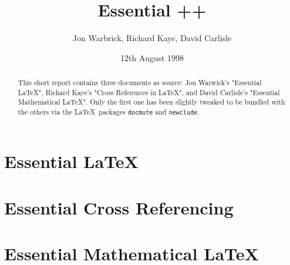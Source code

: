 \documentclass[11pt,a4paper,notitlepage]{article}
\title{Essential \LaTeXe++}
\author{Jon Warbrick, Richard Kaye, David Carlisle}
\date{12th August 1998}
\begin{document}
\maketitle

\begin{abstract}
    This short report contains three documents as source: Jon Warwick's "Essential \LaTeX", Richard Kaye's "Cross References in \LaTeX", and David Carlisle's "Essential Mathematical \LaTeX". Only the first one has been slightly tweaked to be bundled with the others via the \LaTeX\ packages \verb|docmute| and \verb|newclude|.
\end{abstract}
\tableofcontents
\listoftables

\let\fulltableofcontents\tableofcontents
\let\tableofcontents\relax
\let\fulllistoftables\listoftables
\let\listoftables\relax
\let\listoffigures\relax


\section*{Essential \LaTeX}

\section*{Essential Cross Referencing}

\section*{Essential Mathematical \LaTeX}

% 
% 

\end{document}
